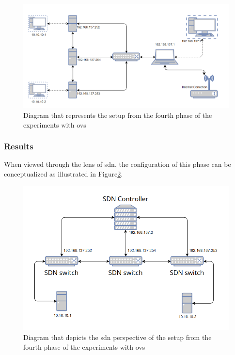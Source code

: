\begin{figure}
	\centering
	\includegraphics[width=\textwidth]{Chapters/Figures/tests/ovs_phase_4/setup_diagram.PNG}
	\caption{Diagram that represents the setup from the fourth phase of the experiments with \gls{ovs}}
	\label{fig:exp1_phase4_diagram}
\end{figure}

\subsubsection{Results}

When viewed through the lens of \gls{sdn}, the configuration of this phase can be conceptualized as illustrated in Figure\ref{fig:exp1_phase4_sdn_diagram}.

\begin{figure}
	\centering
	\includegraphics[width=\textwidth]{Chapters/Figures/tests/ovs_phase_4/sdn_diagram.PNG}
	\caption{Diagram that depicts the \gls{sdn} perspective of the setup from the fourth phase of the experiments with \gls{ovs}}
	\label{fig:exp1_phase4_sdn_diagram}
\end{figure}

